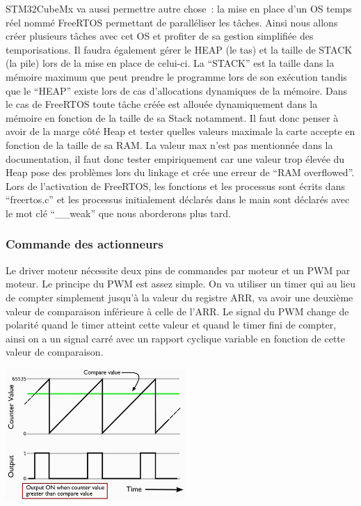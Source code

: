 \documentclass{article}
\begin{document}
STM32CubeMx va aussi permettre autre chose~: la mise en place d'un OS temps réel nommé FreeRTOS permettant de paralléliser les tâches. Ainsi nous allons créer plusieurs tâches avec cet OS et profiter de sa gestion simplifiée des temporisations. Il faudra également gérer le HEAP (le tas) et la taille de STACK (la pile) lors de la mise en place de celui-ci. La ``STACK'' est la taille dans la mémoire maximum que peut prendre le programme lors de son exécution tandis que le ``HEAP'' existe lors de cas d'allocations dynamiques de la mémoire. Dans le cas de FreeRTOS toute tâche créée est allouée dynamiquement dans la mémoire en fonction de la taille de sa Stack notamment. Il faut donc penser à avoir de la marge côté Heap et tester quelles valeurs maximale la carte accepte en fonction de la taille de sa RAM. La valeur max n'est pas mentionnée dans la documentation, il faut donc tester empiriquement car une valeur trop élevée du Heap pose des problèmes lors du linkage et crée une erreur de ``RAM overflowed''. \\

Lors de l'activation de FreeRTOS, les fonctions et les processus sont écrits dans ``freertos.c'' et les processus initialement déclarés dans le main sont déclarés avec le mot clé ``\_\_weak'' que nous aborderons plus tard. \\

\subsubsection{Commande des actionneurs}

Le driver moteur nécessite deux pins de commandes par moteur et un PWM par moteur. Le principe du PWM est assez simple. On va utiliser un timer qui au lieu de compter simplement jusqu'à la valeur du registre ARR, va avoir une deuxième valeur de comparaison inférieure à celle de l'ARR. Le signal du PWM change de polarité quand le timer atteint cette valeur et quand le timer fini de compter, ainsi on a un signal carré avec un rapport cyclique variable en fonction de cette valeur de comparaison. \\

\begin{center}
  \includegraphics[height=5cm]{pwm.png}
\end{center}
\end{document}
